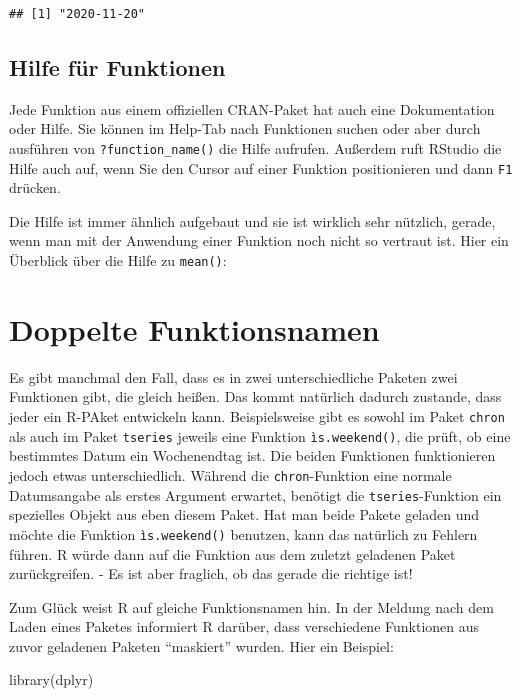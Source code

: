 \documentclass[
]{book}
\newenvironment{Shaded}{\begin{snugshade}}{\end{snugshade}}
\newcommand{\FunctionTok}[1]{\textcolor[rgb]{0.00,0.00,0.00}{#1}}
\newcommand{\NormalTok}[1]{#1}
\begin{document}
\begin{verbatim}
## [1] "2020-11-20"
\end{verbatim}

\hypertarget{hilfe-fuxfcr-funktionen}{%
\subsection{Hilfe für Funktionen}\label{hilfe-fuxfcr-funktionen}}

Jede Funktion aus einem offiziellen CRAN-Paket hat auch eine Dokumentation oder Hilfe. Sie können im Help-Tab nach Funktionen suchen oder aber durch ausführen von \texttt{?function\_name()} die Hilfe aufrufen. Außerdem ruft RStudio die Hilfe auch auf, wenn Sie den Cursor auf einer Funktion positionieren und dann \texttt{F1} drücken.

Die Hilfe ist immer ähnlich aufgebaut und sie ist wirklich sehr nützlich, gerade, wenn man mit der Anwendung einer Funktion noch nicht so vertraut ist. Hier ein Überblick über die Hilfe zu \texttt{mean()}:

\hypertarget{doppelte-funktionsnamen}{%
\section{Doppelte Funktionsnamen}\label{doppelte-funktionsnamen}}

Es gibt manchmal den Fall, dass es in zwei unterschiedliche Paketen zwei Funktionen gibt, die gleich heißen. Das kommt natürlich dadurch zustande, dass jeder ein R-PAket entwickeln kann. Beispielsweise gibt es sowohl im Paket \texttt{chron} als auch im Paket \texttt{tseries} jeweils eine Funktion \texttt{ìs.weekend()}, die prüft, ob eine bestimmtes Datum ein Wochenendtag ist. Die beiden Funktionen funktionieren jedoch etwas unterschiedlich. Während die \texttt{chron}-Funktion eine normale Datumsangabe als erstes Argument erwartet, benötigt die \texttt{tseries}-Funktion ein spezielles Objekt aus eben diesem Paket. Hat man beide Pakete geladen und möchte die Funktion \texttt{ìs.weekend()} benutzen, kann das natürlich zu Fehlern führen. R würde dann auf die Funktion aus dem zuletzt geladenen Paket zurückgreifen. - Es ist aber fraglich, ob das gerade die richtige ist!

Zum Glück weist R auf gleiche Funktionsnamen hin. In der Meldung nach dem Laden eines Paketes informiert R darüber, dass verschiedene Funktionen aus zuvor geladenen Paketen ``maskiert'' wurden. Hier ein Beispiel:

\begin{Shaded}
\begin{Highlighting}[]
\FunctionTok{library}\NormalTok{(dplyr)}
\end{Highlighting}
\end{Shaded}
\end{document}
